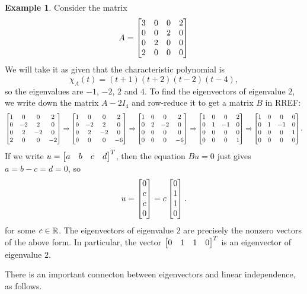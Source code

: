 \documentclass[reqno]{amsart}
\theoremstyle{definition}
\newtheorem{example}[theorem]{Example}
\begin{document}
\begin{example}\label{eg-eigen-v}
 Consider the matrix
 \[ A = \left[\begin{matrix}
         3 & 0 & 0 & 2 \\
         0 & 0 & 2 & 0 \\
         0 & 2 & 0 & 0 \\
         2 & 0 & 0 & 0
        \end{matrix}\right]
 \]
 We will take it as given that the characteristic polynomial is
 \[ \chi_A(t) = (t+1)(t+2)(t-2)(t-4), \]
 so the eigenvalues are $-1$, $-2$, $2$ and $4$.  To find the
 eigenvectors of eigenvalue $2$, we write down the matrix $A-2I_4$ and
 row-reduce it to get a matrix $B$ in RREF:
 \[\left[\begin{matrix}
    1 &  0 &  0 &  2 \\
    0 & -2 &  2 &  0 \\
    0 &  2 & -2 &  0 \\
    2 &  0 &  0 & -2
   \end{matrix}\right]
   \xrightarrow{}
   \left[\begin{matrix}
    1 &  0 &  0 &  2 \\
    0 & -2 &  2 &  0 \\
    0 &  2 & -2 &  0 \\
    0 &  0 &  0 & -6
   \end{matrix}\right]
   \xrightarrow{}
   \left[\begin{matrix}
    1 &  0 &  0 &  2 \\
    0 &  2 & -2 &  0 \\
    0 &  0 &  0 &  0 \\
    0 &  0 &  0 & -6
   \end{matrix}\right]
   \xrightarrow{}
   \left[\begin{matrix}
    1 &  0 &  0 &  2 \\
    0 &  1 & -1 &  0 \\
    0 &  0 &  0 &  0 \\
    0 &  0 &  0 &  1
   \end{matrix}\right]
   \xrightarrow{}
   \left[\begin{matrix}
    1 &  0 &  0 &  0 \\
    0 &  1 & -1 &  0 \\
    0 &  0 &  0 &  1 \\
    0 &  0 &  0 &  0
   \end{matrix}\right].
 \]
 If we write $u=\left[\begin{matrix} a & b & c & d\end{matrix}\right]^T$, then the equation $Bu=0$
 just gives $a=b-c=d=0$, so
 \[ u = \left[\begin{matrix} 0 \\ c \\ c \\ 0 \end{matrix}\right] = c \left[\begin{matrix} 0 \\ 1 \\ 1 \\ 0 \end{matrix}\right]. \]
 for some $c\in{\mathbb{R}}$.  The eigenvectors of eigenvalue $2$ are
 precisely the nonzero vectors of the above form.  In particular, the
 vector $\left[\begin{matrix} 0 & 1 & 1 & 0\end{matrix}\right]^T$ is an eigenvector of eigenvalue $2$.
\end{example}

There is an important connecton between eigenvectors and linear
independence, as follows.
\end{document}
